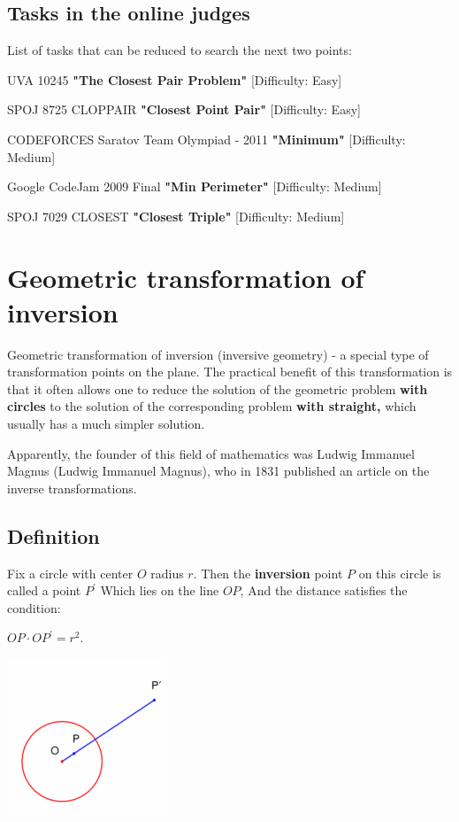 \subsection{ Tasks in the online judges }

List of tasks that can be reduced to search the next two points:

UVA 10245 \textbf{"The Closest Pair Problem"} [Difficulty: Easy]

SPOJ 8725 CLOPPAIR \textbf{"Closest Point Pair"} [Difficulty: Easy]

CODEFORCES Saratov Team Olympiad - 2011 \textbf{"Minimum"} [Difficulty: Medium]

Google CodeJam 2009 Final \textbf{"Min Perimeter"} [Difficulty: Medium]

SPOJ 7029 CLOSEST \textbf{"Closest Triple"} [Difficulty: Medium]

\section{ Geometric transformation of inversion }
Geometric transformation of inversion (inversive geometry) - a special type of transformation points on the plane. The practical benefit of this transformation is that it often allows one to reduce the solution of the geometric problem \textbf{with circles} to the solution of the corresponding problem \textbf{with straight,} which usually has a much simpler solution.

Apparently, the founder of this field of mathematics was Ludwig Immanuel Magnus (Ludwig Immanuel Magnus), who in 1831 published an article on the inverse transformations.

\subsection{ Definition }

Fix a circle with center $O$ radius $r$. Then the \textbf{inversion} point $P$ on this circle is called a point $P ^ \prime$ Which lies on the line $OP$, And the distance satisfies the condition:

$OP \cdot OP ^ \prime = r ^ 2.$

\includegraphics[scale=0.75]{6.png}

